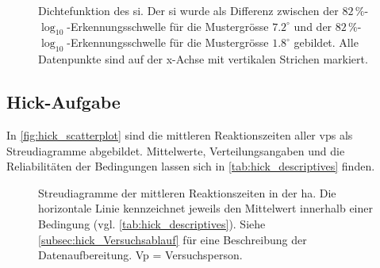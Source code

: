 \documentclass[11pt, twoside, a4paper]{book}		%
\begin{document}
\begin{figure}[htbp]
	\centering
	\begin{adjustbox}{width=1\textwidth}
		
	\end{adjustbox}
	\caption[Dichtefunktion des \gls{si}]{Dichtefunktion des \gls{si}. Der \gls{si} wurde als Differenz zwischen der $82\,\%$-$\log_{10}$-Er\-ken\-nungs\-schwel\-le für die Mustergrösse $7.2^{\circ}$ und der $82\,\%$-$\log_{10}$-Er\-ken\-nungs\-schwel\-le für die Mustergrösse $1.8^{\circ}$ gebildet. Alle Datenpunkte sind auf der x-Achse mit vertikalen Strichen markiert.}
	\label{fig:suppression_index_density}
\end{figure}

\subsection{Hick-Aufgabe}

In \autoref{fig:hick_scatterplot} sind die mittleren Reaktionszeiten aller \glspl{vp} als Streudiagramme abgebildet.
Mittelwerte, Verteilungsangaben und die Reliabilitäten der Bedingungen lassen sich in \autoref{tab:hick_descriptives} finden. 

\begin{figure}[p]
	\centering
	\begin{adjustbox}{width=1\textwidth}
		
	\end{adjustbox}
	\caption[Streudiagramme der Reaktionszeiten in der \gls{ha}]{Streudiagramme der mittleren Reaktionszeiten in der \gls{ha}. Die horizontale Linie kennzeichnet jeweils den Mittelwert innerhalb einer Bedingung (vgl. \autoref{tab:hick_descriptives}). Siehe \autoref{subsec:hick_Versuchsablauf} für eine Beschreibung der Datenaufbereitung. Vp = Versuchsperson.}
	\label{fig:hick_scatterplot}
\end{figure}
\end{document}
